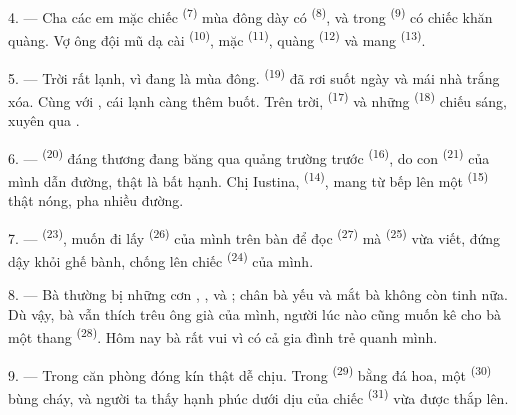 4. --- Cha các em mặc chiếc  \textsuperscript{(7)} mùa đông dày có
 \textsuperscript{(8)}, và trong  \textsuperscript{(9)} có
chiếc khăn quàng. Vợ ông đội mũ dạ cài  \textsuperscript{(10)}, mặc
 \textsuperscript{(11)}, quàng  \textsuperscript{(12)}
và mang  \textsuperscript{(13)}.

5. --- Trời rất lạnh, vì đang là mùa đông.  \textsuperscript{(19)} đã rơi
suốt ngày và mái nhà trắng xóa. Cùng với , cái lạnh càng thêm buốt. Trên
trời,  \textsuperscript{(17)} và những 
\textsuperscript{(18)} chiếu sáng, xuyên qua .

\VUsaut{4.2mm}
\VUsaut{3.0mm}

6. ---  \textsuperscript{(20)} đáng thương đang băng qua quảng trường
trước  \textsuperscript{(16)}, do con 
\textsuperscript{(21)} của mình dẫn đường, thật là bất hạnh. Chị Iustina,  \textsuperscript{(14)}, mang từ bếp lên một 
\textsuperscript{(15)}  thật nóng, pha nhiều đường.

7. ---  \textsuperscript{(23)}, muốn đi lấy 
\textsuperscript{(26)} của mình trên bàn để đọc 
\textsuperscript{(27)} mà  \textsuperscript{(25)} vừa viết, đứng dậy khỏi
ghế bành, chống lên chiếc  \textsuperscript{(24)} của mình.

8. --- Bà thường bị những cơn , ,  và
; chân bà yếu và mắt bà không còn tinh nữa. Dù vậy, bà vẫn thích trêu
ông  già của mình, người lúc nào cũng muốn kê cho bà một thang
 \textsuperscript{(28)}. Hôm nay bà rất vui vì có cả gia đình trẻ
quanh mình.

9. --- Trong căn phòng đóng kín thật dễ chịu. Trong 
\textsuperscript{(29)} bằng đá hoa, một  \textsuperscript{(30)}
bùng cháy, và người ta thấy hạnh phúc dưới  dịu của chiếc 
\textsuperscript{(31)} vừa được thắp lên.

\VUsaut{4.2mm}
\VUsaut{3.0mm}

